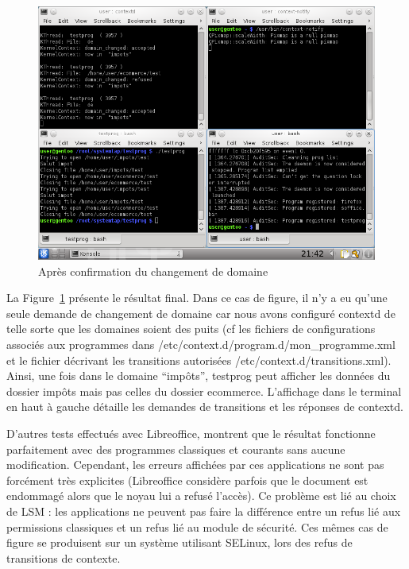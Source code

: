 \documentclass[pdftex,a4paper,titlepage,11pt]{article}
\begin{document}
\begin{figure}
	\centering
	\includegraphics[scale=0.5]{attachements/capture_fin.png}
	\caption{Après confirmation du changement de domaine}
	\label{FIN}
\end{figure}

La Figure~\ref{FIN} présente le résultat final. Dans ce cas de figure, il n'y a eu qu'une seule demande de changement de domaine car nous avons configuré contextd de telle sorte que les domaines soient des puits (cf les fichiers de configurations associés aux programmes dans /etc/context.d/program.d/mon\_programme.xml et le fichier décrivant les transitions autorisées /etc/context.d/transitions.xml). Ainsi, une fois dans le domaine ``impôts'', testprog peut afficher les données du dossier impôts mais pas celles du dossier ecommerce. L'affichage dans le terminal en haut à gauche détaille les demandes de transitions et les réponses de contextd.

D'autres tests effectués avec Libreoffice, montrent que le résultat fonctionne parfaitement avec des programmes classiques et courants sans aucune modification. Cependant, les erreurs affichées par ces applications ne sont pas forcément très explicites (Libreoffice considère parfois que le document est endommagé alors que le noyau lui a refusé l'accès). Ce problème est lié au choix de LSM : les applications ne peuvent pas faire la différence entre un refus lié aux permissions classiques et un refus lié au module de sécurité. Ces mêmes cas de figure se produisent sur un système utilisant SELinux, lors des refus de transitions de contexte.
\end{document}
